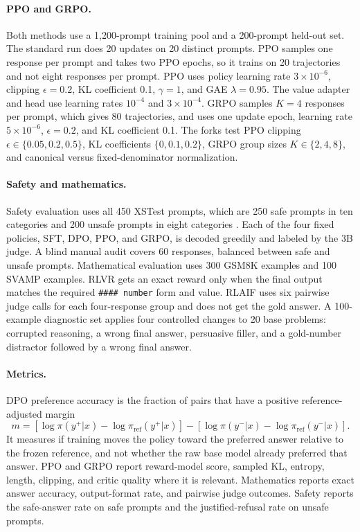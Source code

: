 \documentclass{article}
\begin{document}
\paragraph{PPO and GRPO.}
Both methods use a 1,200-prompt training pool and a 200-prompt held-out set. The standard run does 20 updates on 20 distinct prompts. PPO samples one response per prompt and takes two PPO epochs, so it trains on 20 trajectories and not eight responses per prompt. PPO uses policy learning rate $3\times10^{-6}$, clipping $\epsilon=0.2$, KL coefficient 0.1, $\gamma=1$, and GAE $\lambda=0.95$. The value adapter and head use learning rates $10^{-4}$ and $3\times10^{-4}$. GRPO samples $K=4$ responses per prompt, which gives 80 trajectories, and uses one update epoch, learning rate $5\times10^{-6}$, $\epsilon=0.2$, and KL coefficient 0.1. The forks test PPO clipping $\epsilon\in\{0.05,0.2,0.5\}$, KL coefficients $\{0,0.1,0.2\}$, GRPO group sizes $K\in\{2,4,8\}$, and canonical versus fixed-denominator normalization.

\paragraph{Safety and mathematics.}
Safety evaluation uses all 450 XSTest prompts, which are 250 safe prompts in ten categories and 200 unsafe prompts in eight categories \citep{rottger2023xstest}. Each of the four fixed policies, SFT, DPO, PPO, and GRPO, is decoded greedily and labeled by the 3B judge. A blind manual audit covers 60 responses, balanced between safe and unsafe prompts. Mathematical evaluation uses 300 GSM8K examples and 100 SVAMP examples. RLVR gets an exact reward only when the final output matches the required \texttt{\#\#\#\# number} form and value. RLAIF uses six pairwise judge calls for each four-response group and does not get the gold answer. A 100-example diagnostic set applies four controlled changes to 20 base problems: corrupted reasoning, a wrong final answer, persuasive filler, and a gold-number distractor followed by a wrong final answer.

\paragraph{Metrics.}
DPO preference accuracy is the fraction of pairs that have a positive reference-adjusted margin
\begin{equation}
m=[\log\pi(y^+|x)-\log\pi_{\mathrm{ref}}(y^+|x)]-[\log\pi(y^-|x)-\log\pi_{\mathrm{ref}}(y^-|x)].
\end{equation}
It measures if training moves the policy toward the preferred answer relative to the frozen reference, and not whether the raw base model already preferred that answer. PPO and GRPO report reward-model score, sampled KL, entropy, length, clipping, and critic quality where it is relevant. Mathematics reports exact answer accuracy, output-format rate, and pairwise judge outcomes. Safety reports the safe-answer rate on safe prompts and the justified-refusal rate on unsafe prompts.
\end{document}
